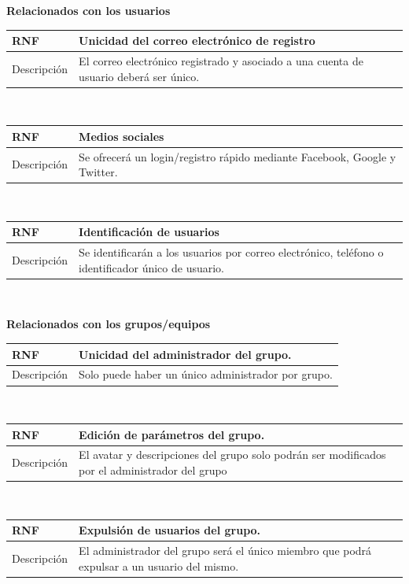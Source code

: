 \documentclass[twoside]{report}
\newcommand\addrow[2]{#1 &#2\\ }
\newcommand\addheading[2]{#1 &#2\\ \hline}
\newcommand\tabularhead{\begin{tabular}{lp{0.7\textwidth}}
\hline
}
\newenvironment{req}{\tabularhead}
{\hline\end{tabular}}
\begin{document}
\textbf{Relacionados con los usuarios}\\

\begin{req}
	\addheading{\textbf{RNF\arabic{nonFunctionalRequirements}}}{Unicidad del correo electrónico de registro}
	\addrow{Descripción}{El correo electrónico registrado y asociado a una cuenta de usuario deberá ser único.}
\end{req}\\

\begin{req}
	\addheading{\textbf{RNF\arabic{nonFunctionalRequirements}}}{Medios sociales}
	\addrow{Descripción}{Se ofrecerá un login/registro rápido mediante Facebook, Google y Twitter.}
\end{req}\\

\begin{req}
	\addheading{\textbf{RNF\arabic{nonFunctionalRequirements}}}{Identificación de usuarios}
	\addrow{Descripción}{Se identificarán a los usuarios por correo electrónico, teléfono o identificador único de usuario.}
\end{req}\\

\textbf{Relacionados con los grupos/equipos}\\

\begin{req}
	\addheading{\textbf{RNF\arabic{nonFunctionalRequirements}}}{Unicidad del administrador del grupo.}
	\addrow{Descripción}{Solo puede haber un único administrador por grupo.}
\end{req}\\

\begin{req}
	\addheading{\textbf{RNF\arabic{nonFunctionalRequirements}}}{Edición de parámetros del grupo.}
	\addrow{Descripción}{El avatar y descripciones del grupo solo podrán ser modificados por el administrador del grupo}
\end{req}\\

\begin{req}
	\addheading{\textbf{RNF\arabic{nonFunctionalRequirements}}}{Expulsión de usuarios del grupo.}
	\addrow{Descripción}{El administrador del grupo será el único miembro que podrá expulsar a un usuario del mismo.}
\end{req}\\
\end{document}
